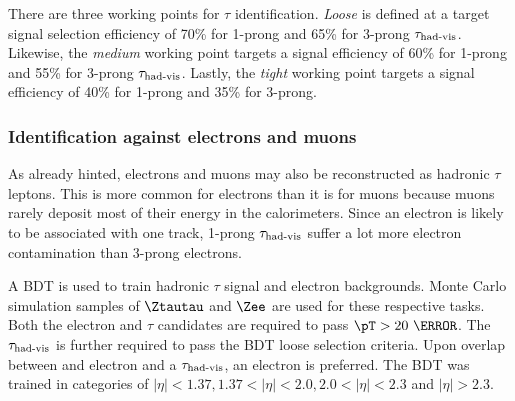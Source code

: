 \par There are three working points for $\tau$ identification. {\it Loose} is defined at a target signal 
selection efficiency of 70\% for 1-prong and 65\% for 3-prong $\tau_{\text{had-vis}}$. Likewise, the {\it medium} 
working point targets a signal efficiency of 60\% for 1-prong and 55\% for 3-prong $\tau_{\text{had-vis}}$. Lastly, 
the {\it tight} working point targets a signal efficiency of 40\% for 1-prong and 35\% for 3-prong.  
%

\subsubsection{Identification against electrons and muons}
\par As already hinted, electrons and muons may also be reconstructed as hadronic $\tau$ leptons. 
This is more common for electrons than it is for muons because muons rarely deposit most of their 
energy in the calorimeters. Since an electron is likely to be associated with one track, 1-prong 
$\tau_{\text{had-vis}}$ suffer a lot more electron contamination than 3-prong electrons. 

\par A BDT is used to train hadronic $\tau$ signal and electron backgrounds. Monte Carlo simulation samples of 
$\Ztautau$ and $\Zee$ are used for these respective tasks. Both the electron and $\tau$ candidates 
are required to pass $\pT>20~\GeV$. The $\tau_{\text{had-vis}}$ is further required to pass the BDT loose 
selection criteria. Upon overlap between and electron and a $\tau_{\text{had-vis}}$, an electron is preferred.    
The BDT was trained in categories of $|\eta|<1.37, 1.37<|\eta|<2.0, 2.0<|\eta|<2.3$ and 
$|\eta|>2.3$.

